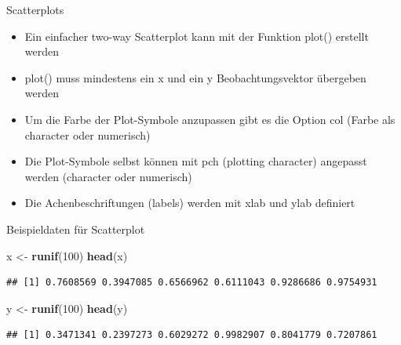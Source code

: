 \documentclass[ignorenonframetext,]{beamer}
\newenvironment{Shaded}{}{}
\newcommand{\KeywordTok}[1]{\textcolor[rgb]{0.00,0.44,0.13}{\textbf{{#1}}}}
\newcommand{\DecValTok}[1]{\textcolor[rgb]{0.25,0.63,0.44}{{#1}}}
\newcommand{\StringTok}[1]{\textcolor[rgb]{0.25,0.44,0.63}{{#1}}}
\newcommand{\NormalTok}[1]{{#1}}
\providecommand{\tightlist}{%
\setlength{\itemsep}{0pt}\setlength{\parskip}{0pt}}
\begin{document}
\begin{frame}{Scatterplots}

\begin{itemize}
\tightlist
\item
  Ein einfacher two-way Scatterplot kann mit der Funktion plot()
  erstellt werden
\item
  plot() muss mindestens ein x und ein y Beobachtungsvektor übergeben
  werden
\item
  Um die Farbe der Plot-Symbole anzupassen gibt es die Option col (Farbe
  als character oder numerisch)
\item
  Die Plot-Symbole selbst können mit pch (plotting character) angepasst
  werden (character oder numerisch)
\item
  Die Achenbeschriftungen (labels) werden mit xlab und ylab definiert
\end{itemize}

\end{frame}

\begin{frame}[fragile]{Beispieldaten für Scatterplot}

\begin{Shaded}
\begin{Highlighting}[]
\NormalTok{x <-}\StringTok{ }\KeywordTok{runif}\NormalTok{(}\DecValTok{100}\NormalTok{)}
\KeywordTok{head}\NormalTok{(x)}
\end{Highlighting}
\end{Shaded}

\begin{verbatim}
## [1] 0.7608569 0.3947085 0.6566962 0.6111043 0.9286686 0.9754931
\end{verbatim}

\begin{Shaded}
\begin{Highlighting}[]
\NormalTok{y <-}\StringTok{ }\KeywordTok{runif}\NormalTok{(}\DecValTok{100}\NormalTok{)}
\KeywordTok{head}\NormalTok{(y)}
\end{Highlighting}
\end{Shaded}

\begin{verbatim}
## [1] 0.3471341 0.2397273 0.6029272 0.9982907 0.8041779 0.7207861
\end{verbatim}

\end{frame}
\end{document}
